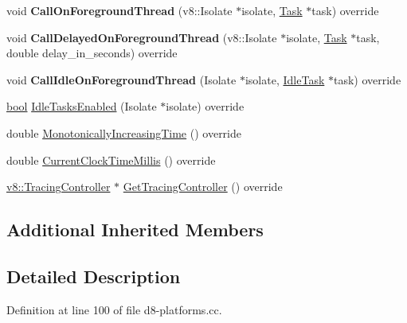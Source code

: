 \begin{DoxyCompactItemize}
\item 
\mbox{\label{classv8_1_1DelayedTasksPlatform_a5da51c1996e60f63df31f16bb62460b2}} 
void {\bfseries Call\+On\+Foreground\+Thread} (v8\+::\+Isolate $\ast$isolate, \mbox{\hyperlink{classv8_1_1Task}{Task}} $\ast$task) override
\item 
\mbox{\label{classv8_1_1DelayedTasksPlatform_ae753f31829ed03f23501eb2b6cb9075f}} 
void {\bfseries Call\+Delayed\+On\+Foreground\+Thread} (v8\+::\+Isolate $\ast$isolate, \mbox{\hyperlink{classv8_1_1Task}{Task}} $\ast$task, double delay\+\_\+in\+\_\+seconds) override
\item 
\mbox{\label{classv8_1_1DelayedTasksPlatform_a8a06779fa55385124832ca6385777aad}} 
void {\bfseries Call\+Idle\+On\+Foreground\+Thread} (Isolate $\ast$isolate, \mbox{\hyperlink{classv8_1_1IdleTask}{Idle\+Task}} $\ast$task) override
\item 
\mbox{\hyperlink{classbool}{bool}} \mbox{\hyperlink{classv8_1_1DelayedTasksPlatform_a1ac3788b072ee705cd2de6cc08556295}{Idle\+Tasks\+Enabled}} (Isolate $\ast$isolate) override
\item 
double \mbox{\hyperlink{classv8_1_1DelayedTasksPlatform_a071eea7329b3d7ed1f2b9c4a444bf128}{Monotonically\+Increasing\+Time}} () override
\item 
double \mbox{\hyperlink{classv8_1_1DelayedTasksPlatform_a12819f1b8581ce7a19f5a6eabae6c14c}{Current\+Clock\+Time\+Millis}} () override
\item 
\mbox{\hyperlink{classv8_1_1TracingController}{v8\+::\+Tracing\+Controller}} $\ast$ \mbox{\hyperlink{classv8_1_1DelayedTasksPlatform_a7d8406d5b169da8645d65bb06bc8bbc6}{Get\+Tracing\+Controller}} () override
\end{DoxyCompactItemize}
\subsection*{Additional Inherited Members}


\subsection{Detailed Description}


Definition at line 100 of file d8-\/platforms.\+cc.



